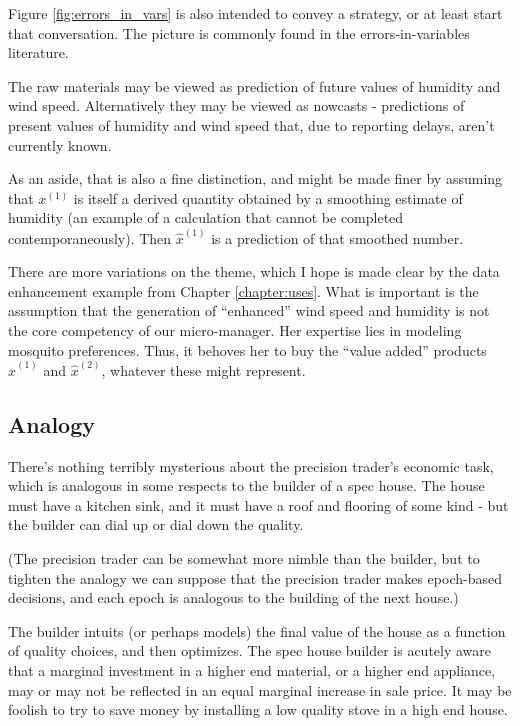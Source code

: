 Figure \ref{fig:errors_in_vars} is also intended to convey a strategy, or at least start that conversation. The picture is commonly found in the errors-in-variables literature. 

The raw materials may be viewed as prediction of future values of humidity and wind speed. Alternatively they may be viewed as nowcasts - predictions of present values of humidity and wind speed that, due to reporting delays, aren't currently known. 

As an aside, that is also a fine distinction, and might be made finer by assuming that $x^{(1)}$ is itself a derived quantity obtained by a smoothing estimate of humidity (an example of a calculation that cannot be completed contemporaneously). Then $\hat{x}^{(1)}$ is a prediction of that smoothed number. 

There are more variations on the theme, which I hope is made clear by the data enhancement example from Chapter \ref{chapter:uses}. What is important is the assumption that the generation of ``enhanced'' wind speed and humidity is not the core competency of our micro-manager. Her expertise lies in modeling mosquito preferences. Thus, it behoves her to buy the ``value added'' products $\hat{x}^{(1)}$ and $\hat{x}^{(2)}$, whatever these might represent.  


\subsection{Analogy}

There's nothing terribly mysterious about the precision trader's economic task, which is analogous in some respects to the builder of a spec house. The house must have a kitchen sink, and it must have a roof and flooring of some kind - but the builder can dial up or dial down the quality.

(The precision trader can be somewhat more nimble than the builder, but to tighten the analogy we can suppose that the precision trader makes epoch-based decisions, and each epoch is analogous to the building of the next house.)  

The builder intuits (or perhaps models) the final value of the house as a function of quality choices, and then optimizes. The spec house builder is acutely aware that a marginal investment in a higher end material, or a higher end appliance, may or may not be reflected in an equal marginal increase in sale price. It may be foolish to try to save money by installing a low quality stove in a high end house. 

